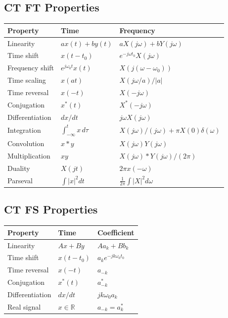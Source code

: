\documentclass[11pt]{article}
\begin{document}
\subsection{CT FT Properties}
\begin{center}
\begin{tabular}{|l|l|l|}
\hline
Property & Time & Frequency\\
\hline
Linearity & $ax(t)+by(t)$ & $aX(j\omega)+bY(j\omega)$\\
Time shift & $x(t-t_0)$ & $e^{-j\omega t_0}X(j\omega)$\\
Frequency shift & $e^{j\omega_0 t}x(t)$ & $X(j(\omega-\omega_0))$\\
Time scaling & $x(at)$ & $X(j\omega/a)/|a|$\\
Time reversal & $x(-t)$ & $X(-j\omega)$\\
Conjugation & $x^*(t)$ & $X^*(-j\omega)$\\
Differentiation & $dx/dt$ & $j\omega X(j\omega)$\\
Integration & $\int_{-\infty}^t x\,d\tau$ & $X(j\omega)/(j\omega)+\pi X(0)\delta(\omega)$\\
Convolution & $x*y$ & $X(j\omega)Y(j\omega)$\\
Multiplication & $xy$ & $X(j\omega)*Y(j\omega)/(2\pi)$\\
Duality & $X(jt)$ & $2\pi x(-\omega)$\\
Parseval & $\int|x|^2 dt$ & $\frac{1}{2\pi}\int|X|^2 d\omega$\\
\hline
\end{tabular}
\end{center}

\subsection{CT FS Properties}
\begin{center}
\begin{tabular}{|l|l|l|}
\hline
Property & Time & Coefficient\\
\hline
Linearity & $Ax+By$ & $Aa_k+Bb_k$\\
Time shift & $x(t-t_0)$ & $a_k e^{-jk\omega_0 t_0}$\\
Time reversal & $x(-t)$ & $a_{-k}$\\
Conjugation & $x^*(t)$ & $a_{-k}^*$\\
Differentiation & $dx/dt$ & $jk\omega_0 a_k$\\
Real signal & $x\in\mathbb{R}$ & $a_{-k}=a_k^*$\\
\hline
\end{tabular}
\end{center}
\end{document}
